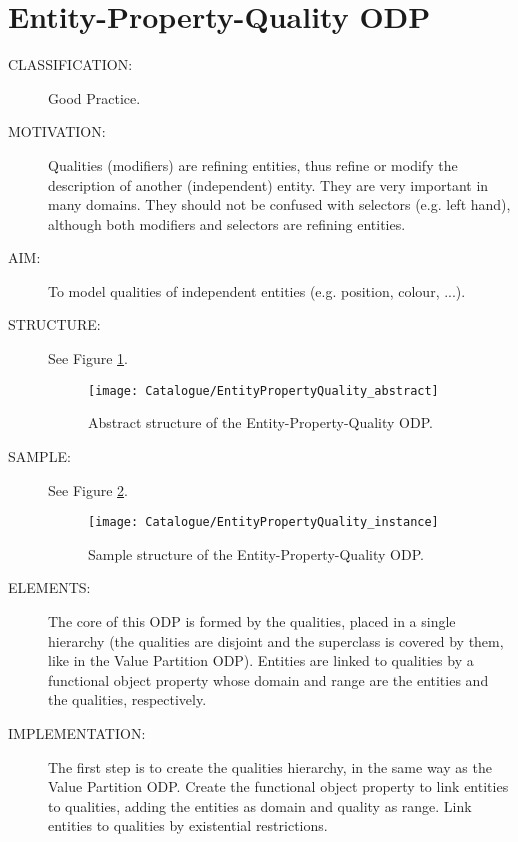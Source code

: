  \section{Entity-Property-Quality ODP}\begin{description}
\item [CLASSIFICATION:] Good Practice.

\item [MOTIVATION:] Qualities (modifiers) are refining entities, thus refine or modify the description of another (independent) entity. They are very important in many domains. They should not be confused with selectors (e.g. left hand), although both modifiers and selectors are refining entities.

\item [AIM:] To model qualities of independent entities (e.g. position, colour, ...).

\item [STRUCTURE:] See Figure \ref{odp:EntityPropertyQuality_abstract}.
\begin{figure}[]\centering\texttt{[image: Catalogue/EntityPropertyQuality\_abstract]}\caption{\label{odp:EntityPropertyQuality_abstract} Abstract structure of the Entity-Property-Quality ODP.}\end{figure}

\item [SAMPLE:] See Figure \ref{odp:EntityPropertyQuality_instance}.
\begin{figure}[]\centering\texttt{[image: Catalogue/EntityPropertyQuality\_instance]}\caption{\label{odp:EntityPropertyQuality_instance} Sample structure of the Entity-Property-Quality ODP.}\end{figure}

\item [ELEMENTS:] The core of this ODP is formed by the qualities, placed in a single hierarchy (the qualities are disjoint and the superclass is covered by them, like in the Value Partition ODP). Entities are linked to qualities by a functional object property whose domain and range are the entities and the qualities, respectively.

\item [IMPLEMENTATION:] The first step is to create the qualities hierarchy, in the same way as the Value Partition ODP. Create the functional object property to link entities to qualities, adding the entities as domain and quality as range. Link entities to qualities by existential restrictions.


\end{description}
